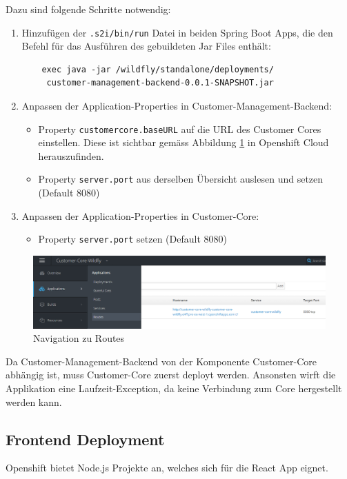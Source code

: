 \documentclass[12pt,a4paper]{article}
\begin{document}
Dazu sind folgende Schritte notwendig:
\begin{enumerate}
	\item Hinzufügen der \texttt{.s2i/bin/run} Datei in beiden Spring Boot Apps, die den Befehl für das Ausführen des gebuildeten Jar Files enthält:
	\begin{lstlisting}
	exec java -jar /wildfly/standalone/deployments/
	 customer-management-backend-0.0.1-SNAPSHOT.jar
	\end{lstlisting}
	\item Anpassen der Application-Properties in Customer-Management-Backend: 
	\begin{itemize}
		\item Property \texttt{customercore.baseURL} auf die URL des Customer Cores einstellen. Diese ist sichtbar gemäss Abbildung \ref{fig:os-routes} in Openshift Cloud herauszufinden. 
		\item Property \texttt{server.port} aus derselben Übersicht auslesen und setzen (Default 8080)
	\end{itemize}
	\item Anpassen der Application-Properties in Customer-Core:
	\begin{itemize}
		\item Property \texttt{server.port} setzen (Default 8080)
	\end{itemize}
\end{enumerate}

\begin{figure}[h]
	\centering
	\includegraphics[width=1\linewidth]{img/os-routes}
	\caption{Navigation zu Routes}
	\label{fig:os-routes}
\end{figure}

Da Customer-Management-Backend von der Komponente Customer-Core abhängig ist, muss Customer-Core zuerst deployt werden. Ansonsten wirft die Applikation eine Laufzeit-Exception, da keine Verbindung zum Core hergestellt werden kann. 

\subsection{Frontend Deployment}\label{subsec:frontend}
Openshift bietet Node.js Projekte an, welches sich für die React App eignet. 
\end{document}
